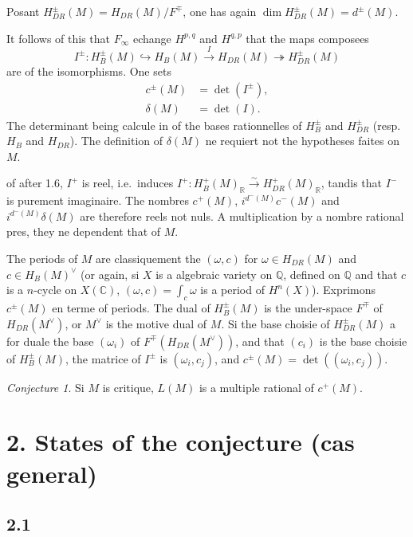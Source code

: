 \documentclass[12pt,a4paper]{article}
\theoremstyle{plain}
\theoremstyle{definition}
\theoremstyle{remark}
\newtheorem{conjecture}[definition]{Conjecture}
\newcommand{\Q}{\mathbb{Q}}
\newcommand{\R}{\mathbb{R}}
\newcommand{\C}{\mathbb{C}}
\begin{document}
Posant $H^\pm_{DR}(M) = H_{DR}(M)/F^\mp$, one has again $\dim H^\pm_{DR}(M) = d^\pm(M)$.

It follows of this that $F_\infty$ echange $H^{p,q}$ and $H^{q,p}$ that the maps composees
\begin{equation}\label{eq:1.7.1}
I^\pm: H^\pm_B(M) \hookrightarrow H_B(M) \xrightarrow{I} H_{DR}(M) \twoheadrightarrow H^\pm_{DR}(M)
\end{equation}
are of the isomorphisms. One sets
\begin{align}
c^\pm(M) &= \det(I^\pm), \label{eq:1.7.2}\\
\delta(M) &= \det(I). \label{eq:1.7.3}
\end{align}
The determinant being calcule in of the bases rationnelles of $H^\pm_B$ and $H^\pm_{DR}$
(resp.~$H_B$ and $H_{DR}$). The definition of $\delta(M)$ ne requiert not the hypotheses faites on $M$.

of after 1.6, $I^+$ is reel, i.e.~induces $I^+: H^+_B(M)_\R \xrightarrow{\sim} H^+_{DR}(M)_\R$,
tandis that $I^-$ is purement imaginaire. The nombres $c^+(M)$, $i^{d^-(M)} c^-(M)$ and
$i^{d^-(M)} \delta(M)$ are therefore reels not nuls. A multiplication by a nombre rational
pres, they ne dependent that of $M$.

The periods of $M$ are classiquement the $(\omega, c)$ for $\omega \in H_{DR}(M)$ and
$c \in H_B(M)^\vee$ (or again, si $X$ is a algebraic variety on $\Q$, defined on $\Q$
and that $c$ is a $n$-cycle on $X(\C)$, $(\omega, c) = \int_c \omega$ is a period of $H^n(X)$).
Exprimons $c^\pm(M)$ en terme of periods. The dual of $H^\pm_B(M)$ is the under-space
$F^\mp$ of $H_{DR}(M^\vee)$, or $M^\vee$ is the motive dual of $M$. Si the base choisie of
$H^\pm_{DR}(M)$ a for duale the base $(\omega_i)$ of $F^\mp(H_{DR}(M^\vee))$, and that $(c_i)$ is the
base choisie of $H^\pm_B(M)$, the matrice of $I^\pm$ is $(\omega_i, c_j)$, and
$c^\pm(M) = \det((\omega_i, c_j))$.

\begin{conjecture}\label{conj:1.8}
Si $M$ is critique, $L(M)$ is a multiple rational of $c^+(M)$.
\end{conjecture}


\section*{2. States of the conjecture (cas general)}

\subsection*{2.1}
\end{document}
